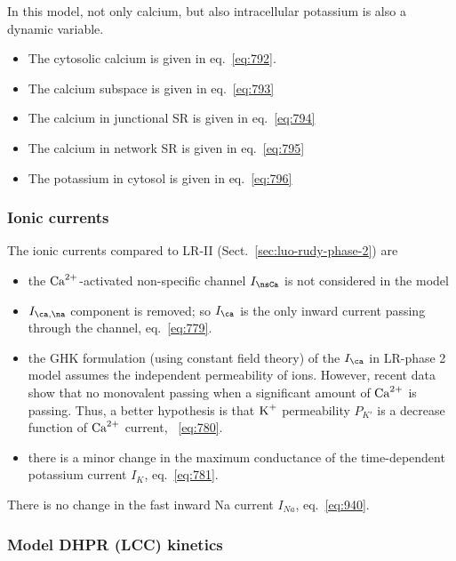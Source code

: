 In this model, not only calcium, but also intracellular potassium is
also a dynamic variable.
\begin{itemize}
\item The cytosolic calcium is given in eq.~\eqref{eq:792}.

\item The calcium subspace is given in eq.~\eqref{eq:793}
\item The calcium in junctional SR is given in eq.~\eqref{eq:794}
\item The calcium in network SR is given in eq.~\eqref{eq:795}

\item The potassium in cytosol is given in eq.~\eqref{eq:796}
\end{itemize}

\subsubsection{Ionic currents}
\label{sec:ionic-currents-4}

The ionic currents compared to LR-II (Sect.~\ref{sec:luo-rudy-phase-2}) are
\begin{itemize}
\item the ${\text{Ca}^{2+}}$-activated non-specific channel $I_\nsCa$ is not considered
  in the model
  
\item $I_{\ca,\na}$ component is removed; so $I_\ca$ is the only inward current
passing through the channel, eq.~\eqref{eq:779}. 

\item the GHK formulation (using constant field theory) of the $I_\ca $ in
LR-phase 2 model assumes the independent permeability of ions.
  However, recent data show that no monovalent passing when a significant amount
  of ${\text{Ca}^{2+}}$ is passing. Thus, a better hypothesis is that $\ce{K+}$ permeability
  $P_{K'}$ is a decrease function of ${\text{Ca}^{2+}}$ current,
  ~\eqref{eq:780}. 
  
\item there is a minor change in the maximum conductance of the
time-dependent potassium current $I_{K}$, eq.~\eqref{eq:781}.  
\end{itemize}
There is no change in the fast inward Na current $I_{Na}$,
eq.~\eqref{eq:940}.


\subsubsection{Model DHPR (LCC) kinetics}
\label{sec:model-dhpr-kinetics}

